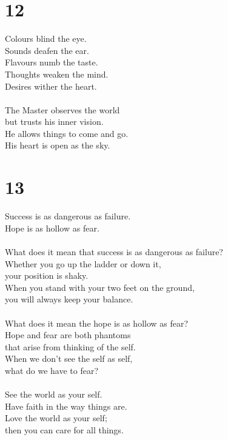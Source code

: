\documentclass[b5paper, 12pt, oneside]{book}
\begin{document}
\chapter*{12}
Colours blind the eye.\\
Sounds deafen the ear.\\
Flavours numb the taste.\\
Thoughts weaken the mind.\\
Desires wither the heart.\\
\\
The Master observes the world\\
but trusts his inner vision.\\
He allows things to come and go.\\
His heart is open as the sky.\\

\chapter*{13}
Success is as dangerous as failure.\\
Hope is as hollow as fear.\\
\\
What does it mean that success is as dangerous as failure?\\
Whether you go up the ladder or down it,\\
your position is shaky.\\
When you stand with your two feet on the ground,\\
you will always keep your balance.\\
\\
What does it mean the hope is as hollow as fear?\\
Hope and fear are both phantoms\\
that arise from thinking of the self.\\
When we don't see the self as self,\\
what do we have to fear?\\
\\
See the world as your self.\\
Have faith in the way things are.\\
Love the world as your self;\\
then you can care for all things.\\
\end{document}
